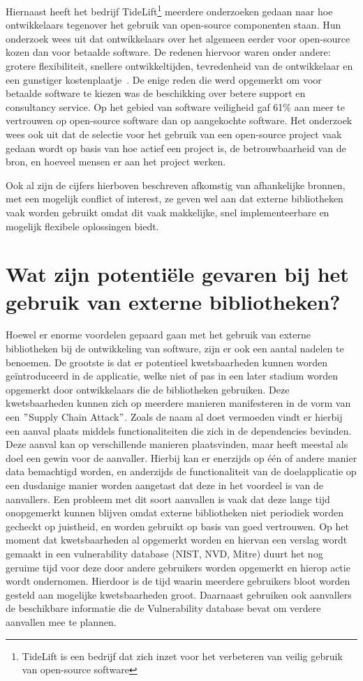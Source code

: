 Hiernaast heeft het bedrijf TideLift\footnote{TideLift is een bedrijf dat zich inzet voor het verbeteren van veilig gebruik van open-source software} meerdere onderzoeken gedaan naar hoe ontwikkelaars tegenover het gebruik van open-source componenten staan. Hun onderzoek wees uit dat ontwikkelaars over het algemeen eerder voor open-source kozen dan voor betaalde software. De redenen hiervoor waren onder andere: grotere flexibiliteit, snellere ontwikkeltijden, tevredenheid van de ontwikkelaar en een gunstiger kostenplaatje~\citep{TideLift:2021}. De enige reden die werd opgemerkt om voor betaalde software te kiezen was de beschikking over betere support en consultancy service. Op het gebied van software veiligheid gaf 61\% aan meer te vertrouwen op open-source software dan op aangekochte software.
Het onderzoek wees ook uit dat de selectie voor het gebruik van een open-source project vaak gedaan wordt op basis van hoe actief een project is, de betrouwbaarheid van de bron, en hoeveel mensen er aan het project werken.

Ook al zijn de cijfers hierboven beschreven afkomstig van afhankelijke bronnen, met een mogelijk conflict of interest, ze geven wel aan dat externe bibliotheken vaak worden gebruikt omdat dit vaak makkelijke, snel implementeerbare en mogelijk flexibele oplossingen biedt.

\section{Wat zijn potentiële gevaren bij het gebruik van externe bibliotheken?} \label{sec:wat-zijn-potentieel-gevaren-die-het-gebruik-van-externe-bibliotheken?}
Hoewel er enorme voordelen gepaard gaan met het gebruik van externe bibliotheken bij de ontwikkeling van software, zijn er ook een aantal nadelen te benoemen. De grootste is dat er potentieel kwetsbaarheden kunnen worden geïntroduceerd in de applicatie, welke niet of pas in een later stadium worden opgemerkt door ontwikkelaars die de bibliotheken gebruiken. Deze kwetsbaarheden kunnen zich op meerdere manieren manifesteren in de vorm van een $"$Supply Chain Attack$"$. Zoals de naam al doet vermoeden vindt er hierbij een aanval plaats middels functionaliteiten die zich in de dependencies bevinden. Deze aanval kan op verschillende manieren plaatsvinden, maar heeft meestal als doel een gewin voor de aanvaller. Hierbij kan er enerzijds op één of andere manier data bemachtigd worden, en anderzijds de functionaliteit van de doelapplicatie op een dusdanige manier worden aangetast dat deze in het voordeel is van de aanvallers. Een probleem met dit soort aanvallen is vaak dat deze lange tijd onopgemerkt kunnen blijven omdat externe bibliotheken niet periodiek worden gecheckt op juistheid, en worden gebruikt op basis van goed vertrouwen. Op het moment dat kwetsbaarheden al opgemerkt worden en hiervan een verslag wordt gemaakt in een vulnerability database (NIST, NVD, Mitre) duurt het nog geruime tijd voor deze door andere gebruikers worden opgemerkt en hierop actie wordt ondernomen. Hierdoor is de tijd waarin meerdere gebruikers bloot worden gesteld aan mogelijke kwetsbaarheden groot. Daarnaast gebruiken ook aanvallers de beschikbare informatie die de Vulnerability database bevat om verdere aanvallen mee te plannen.

